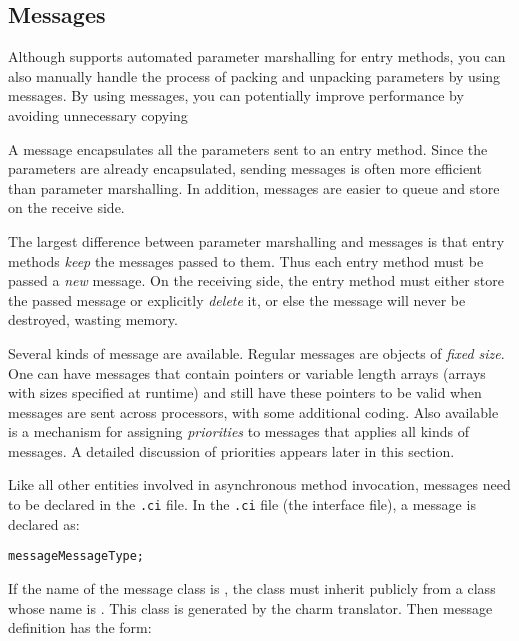 \subsection{Messages}

\label{messages}
Although \charmpp supports automated parameter marshalling for entry methods,
you can also manually handle the process of packing and unpacking parameters by
using messages. By using messages, you can potentially improve performance by
avoiding unnecessary copying

A message encapsulates all the parameters sent to an
entry method.  Since the parameters are already encapsulated,
sending messages is often more efficient than parameter marshalling.
In addition, messages are easier to queue and store on the
receive side.

The largest difference between parameter marshalling and messages
is that entry methods {\em keep} the messages passed to them.
Thus each entry method must be passed a {\em new} message.
On the receiving side, the entry method must either store the
passed message or explicitly {\em delete} it, or else the message
will never be destroyed, wasting memory.

Several kinds of message are available.
Regular \charmpp{} messages are objects of
\textit{fixed size}. One can have messages that contain pointers or variable
length arrays (arrays with sizes specified at runtime) and still have these
pointers to be valid when messages are sent across processors, with some
additional coding.  Also available is a mechanism for assigning
\textit{priorities} to messages that applies all kinds of messages.
A detailed discussion of priorities appears later in this section.

Like all other entities involved in asynchronous method invocation, messages
need to be declared in the {\tt .ci} file. In the {\tt .ci} file (the
interface file), a message is declared as: 

\begin{alltt}
 message MessageType;
\end{alltt}

%
%
If the name of the message class is , the class must inherit 
publicly from a class whose name is . This class
is generated by the charm translator. Then message definition has the form:

